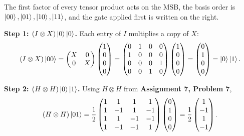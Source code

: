 \documentclass[a4paper, 10pt]{article}
\begin{document}
\begin{solution}
	\noindent The first factor of every tensor product acts on the MSB, the basis order is \( \ket{00}, \ket{01}, \ket{10}, \ket{11} \), and the gate applied first is written on the right.

	\noindent \textbf{Step 1: \( \left(I \otimes X\right)\ket{0}\ket{0} \).} Each entry of \( I \) multiplies a copy of \( X \):
	\[
		\left(I \otimes X\right)\ket{00}
		= \begin{pmatrix} X & 0 \\ 0 & X \end{pmatrix}\begin{pmatrix} 1 \\ 0 \\ 0 \\ 0 \end{pmatrix}
		= \begin{pmatrix}
			0 & 1 & 0 & 0 \\
			1 & 0 & 0 & 0 \\
			0 & 0 & 0 & 1 \\
			0 & 0 & 1 & 0
		\end{pmatrix}\begin{pmatrix} 1 \\ 0 \\ 0 \\ 0 \end{pmatrix}
		= \begin{pmatrix} 0 \\ 1 \\ 0 \\ 0 \end{pmatrix}
		= \ket{0}\ket{1}.
	\]

	\noindent \textbf{Step 2: \( \left(H \otimes H\right)\ket{0}\ket{1} \).} Using \( H \otimes H \) from \textbf{Assignment 7, Problem 7},
	\[
		\left(H \otimes H\right)\ket{01}
		= \frac{1}{2}\begin{pmatrix}
			1 & 1  & 1  & 1  \\
			1 & -1 & 1  & -1 \\
			1 & 1  & -1 & -1 \\
			1 & -1 & -1 & 1
		\end{pmatrix}\begin{pmatrix} 0 \\ 1 \\ 0 \\ 0 \end{pmatrix}
		= \frac{1}{2}\begin{pmatrix} 1 \\ -1 \\ 1 \\ -1 \end{pmatrix}.
	\]


\end{solution}
\end{document}
